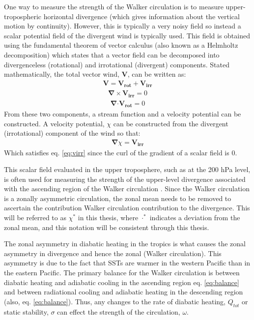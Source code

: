 \documentclass[letterpaper,12pt,titlepage,oneside,final]{book}
\begin{document}
One way to measure the strength of the Walker circulation is to measure upper-tropospheric horizontal divergence (which gives information about the vertical motion by continuity). However, this is typically a very noisy field so instead a scalar potential field of the divergent wind is typically used. This field is obtained using the fundamental theorem of vector calculus (also known as a Helmholtz decomposition) which states that a vector field can be decomposed into divergenceless (rotational) and irrotational (divergent) components. Stated mathematically, the total vector wind, $\mathbf{V}$, can be written as:
\begin{align}
\mathbf{V}=\mathbf{V_{rot}}+\mathbf{V_{irr}}
\end{align}
\begin{align}\label{eq:virr}
\mathbf{\nabla} \times \mathbf{V_{irr}} = 0
\end{align}
\begin{align}
\mathbf{\nabla} \boldsymbol{\cdot}\mathbf{V_{rot}} = 0
\end{align}
From these two components, a stream function and a velocity potential can be constructed.
A velocity potential, $\chi$ can be constructed from the divergent (irrotational) component of the wind so that:
\begin{align}\label{eq:chi}
\mathbf{\nabla}\chi=\mathbf{V_{irr}}
\end{align}
Which satisfies eq. \ref{eq:virr} since the curl of the gradient of a scalar field is 0. 

This scalar field evaluated in the upper troposphere, such as at the 200 hPa level, is often used for measuring the strength of the upper-level divergence associated with the ascending region of the Walker circulation \citep{tanaka_trend_2004}. Since the Walker circulation is a zonally asymmetric circulation, the zonal mean needs to be removed to ascertain the contribution Walker circulation contribution to the divergence. This will be referred to as $\chi^{*}$ in this thesis, where $\cdot^{*}$ indicates a deviation from the zonal mean, and this notation will be consistent through this thesis. 

The zonal asymmetry in diabatic heating in the tropics is what causes the zonal asymmetry in divergence and hence the zonal (Walker circulation). This asymmetry is due to the fact that SSTs are warmer in the western Pacific than in the eastern Pacific. The primary balance for the Walker circulation is between diabatic heating and adiabatic cooling in the ascending region eq. \ref{eq:balance} and between radiational cooling and adiabatic heating in the descending region (also, eq. \ref{eq:balance}). Thus, any changes to the rate of diabatic heating, $Q_{tot}$ or static stability, $\sigma$ can effect the strength of the circulation, $\omega$.
\end{document}
